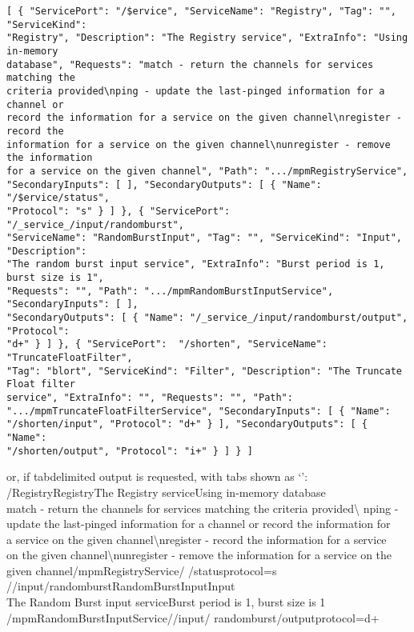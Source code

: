 \begin{verbatim}
[ { "ServicePort": "/$ervice", "ServiceName": "Registry", "Tag": "", "ServiceKind":
"Registry", "Description": "The Registry service", "ExtraInfo": "Using in-memory
database", "Requests": "match - return the channels for services matching the
criteria provided\nping - update the last-pinged information for a channel or
record the information for a service on the given channel\nregister - record the
information for a service on the given channel\nunregister - remove the information
for a service on the given channel", "Path": ".../mpmRegistryService",
"SecondaryInputs": [ ], "SecondaryOutputs": [ { "Name": "/$ervice/status",
"Protocol": "s" } ] }, { "ServicePort": "/_service_/input/randomburst",
"ServiceName": "RandomBurstInput", "Tag": "", "ServiceKind": "Input", "Description":
"The random burst input service", "ExtraInfo": "Burst period is 1, burst size is 1",
"Requests": "", "Path": ".../mpmRandomBurstInputService", "SecondaryInputs": [ ],
"SecondaryOutputs": [ { "Name": "/_service_/input/randomburst/output", "Protocol":
"d+" } ] }, { "ServicePort":  "/shorten", "ServiceName": "TruncateFloatFilter",
"Tag": "blort", "ServiceKind": "Filter", "Description": "The Truncate Float filter
service", "ExtraInfo": "", "Requests": "", "Path":
".../mpmTruncateFloatFilterService", "SecondaryInputs": [ { "Name":
"/shorten/input", "Protocol": "d+" } ], "SecondaryOutputs": [ { "Name":
"/shorten/output", "Protocol": "i+" } ] } ]
\end{verbatim}
\outputEnd{}
or, if tab\longDash{}delimited output is requested, with tabs shown as `\tabSymbol':
\outputBegin{}
/\dollarService\pseudotab{}Registry\pseudotab{}Registry\pseudotwotabs{}The Registry
service\pseudotab{}Using in-memory database\pseudotab\\
match - return the channels for services matching the criteria provided\textbackslash{}%
nping -\\
update the last-pinged information for a channel or record the information for\\
a service on the given channel\textbackslash{}nregister - record the information for a
service\\
on the given channel\textbackslash{}nunregister - remove the information for a service on
the\\
given channel\pseudotab\textellipsis{}/mpmRegistryService\pseudotwotabs{}/\dollarService%
/status\textbraceleft{}protocol=s\textbraceright\\

/\serviceName/input/randomburst\pseudotab{}RandomBurstInput\pseudotwotabs{}Input%
\pseudotab\\
The Random Burst input service\pseudotab{}Burst period is 1, burst size is 1%
\pseudotwotabs\\
\textellipsis{}/mpmRandomBurstInputService\pseudotwotabs{}/\serviceName/input/%
randomburst/output\textbraceleft{}protocol=d+\textbraceright\\

